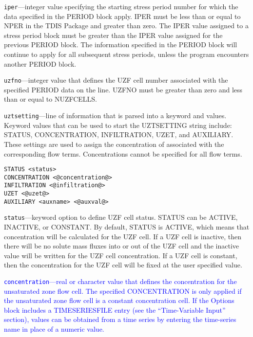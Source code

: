 \begin{description}
\item \texttt{iper}---integer value specifying the starting stress period number for which the data specified in the PERIOD block apply.  IPER must be less than or equal to NPER in the TDIS Package and greater than zero.  The IPER value assigned to a stress period block must be greater than the IPER value assigned for the previous PERIOD block.  The information specified in the PERIOD block will continue to apply for all subsequent stress periods, unless the program encounters another PERIOD block.

\item \texttt{uzfno}---integer value that defines the UZF cell number associated with the specified PERIOD data on the line. UZFNO must be greater than zero and less than or equal to NUZFCELLS.

\item \texttt{uztsetting}---line of information that is parsed into a keyword and values.  Keyword values that can be used to start the UZTSETTING string include: STATUS, CONCENTRATION, INFILTRATION, UZET, and AUXILIARY.  These settings are used to assign the concentration of associated with the corresponding flow terms.  Concentrations cannot be specified for all flow terms.

\begin{lstlisting}[style=blockdefinition]
STATUS <status>
CONCENTRATION <@concentration@>
INFILTRATION <@infiltration@>
UZET <@uzet@>
AUXILIARY <auxname> <@auxval@> 
\end{lstlisting}

\item \texttt{status}---keyword option to define UZF cell status.  STATUS can be ACTIVE, INACTIVE, or CONSTANT. By default, STATUS is ACTIVE, which means that concentration will be calculated for the UZF cell.  If a UZF cell is inactive, then there will be no solute mass fluxes into or out of the UZF cell and the inactive value will be written for the UZF cell concentration.  If a UZF cell is constant, then the concentration for the UZF cell will be fixed at the user specified value.

\item \textcolor{blue}{\texttt{concentration}---real or character value that defines the concentration for the unsaturated zone flow cell. The specified CONCENTRATION is only applied if the unsaturated zone flow cell is a constant concentration cell. If the Options block includes a TIMESERIESFILE entry (see the ``Time-Variable Input'' section), values can be obtained from a time series by entering the time-series name in place of a numeric value.}


\end{description}
